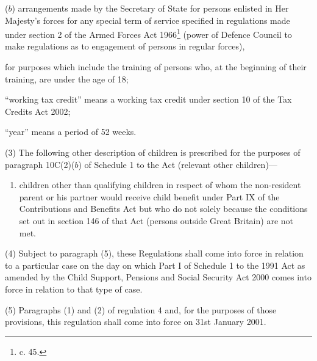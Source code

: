 \documentclass[12pt,a4paper]{article}
\begin{document}
\begin{enumerate}
\begin{enumerate}
($b$) 
arrangements made by the Secretary of State for persons enlisted in Her Majesty’s forces for any special term of service specified in regulations made under section 2 of the Armed Forces Act 1966\footnote{ c. 45.} (power of Defence Council to make regulations as to engagement of persons in regular forces),
\end{enumerate}
for purposes which include the training of persons who, at the beginning of their training, are under the age of 18;


“working tax credit” means a working tax credit under section 10 of the Tax Credits Act 2002;

“year” means a period of 52 weeks.
\end{enumerate}

(3) The following other description of children is prescribed for the purposes of paragraph 10C(2)($b$)  of Schedule 1 to the Act (relevant other children)—
\begin{enumerate}\item[]
    children other than qualifying children in respect of whom the non-resident parent or his partner would receive child benefit under Part IX of the Contributions and Benefits Act but who do not solely because the conditions set out in section 146 of that Act (persons outside Great Britain) are not met. 
\end{enumerate}

(4) Subject to paragraph (5), these Regulations shall come into force in relation to a particular case on the day on which Part I of Schedule 1 to the 1991 Act as amended by the Child Support, Pensions and Social Security Act 2000 comes into force in relation to that type of case.

(5) Paragraphs (1) and (2) of regulation 4 and, for the purposes of those provisions, this regulation shall come into force on 31st January 2001.

\end{document}
